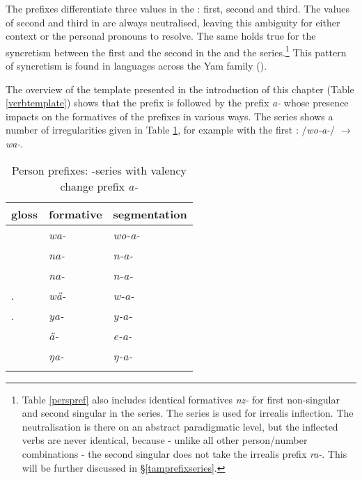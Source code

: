The prefixes differentiate three  values in the : first, second and third. The values of second and third  in  are always neutralised, leaving this ambiguity for either context or the personal pronouns to resolve. The same holds true for the syncretism between the first  and the second  in the \Alph{} and the \Gam{} series.\footnote{Table \ref{perspref} also includes identical formatives \emph{nz-} for first non-singular and second singular in the \Bet{} series. The \Bet{} series is used for irrealis inflection. The neutralisation is there on an abstract paradigmatic level, but the inflected verbs are never identical, because - unlike all other person/number combinations - the second singular does not take the irrealis prefix \emph{ra-}. This will be further discussed in \S{}\ref{tamprefixseries}.} This pattern of syncretism is found in languages across the Yam family (\citealt{Evans:sng}).%

The overview of the  template presented in the introduction of this chapter (Table \ref{verbtemplate}) shows that the  prefix is followed by the  prefix \emph{a-} whose presence impacts on the formatives of the  prefixes in various ways. The \Alph{} series shows a number of irregularities given in Table \ref{persprefwithvalencychange}, for example with the first : /\emph{wo-a-}/ $\rightarrow$ \emph{wa-}.

\begin{table}
\caption{Person prefixes: \Alph-series with valency change prefix \emph{a-}}
\label{persprefwithvalencychange}
	\begin{tabularx}{\textwidth}{XXl}
		\lsptoprule
		{gloss} &{formative} &{segmentation}\\\midrule
		\Fsg &\emph{wa-} &\emph{wo-a-}\\
		\Fnsg &\emph{na-} &\emph{n-a-}\\
		\Ssg &\emph{na-} &\emph{n-a-}\\
		\Tsg.\F	&\emph{wä-} &\emph{w-a-}\\
		\Tsg.\Masc &\emph{ya-} &\emph{y-a-}\\
		\Stnsg &\emph{ä-} &\emph{e-a-}\footnotemark\\
		\M &\emph{ŋa-} &\emph{ŋ-a-}\\
		\lspbottomrule
	\end{tabularx}
\end{table}%

